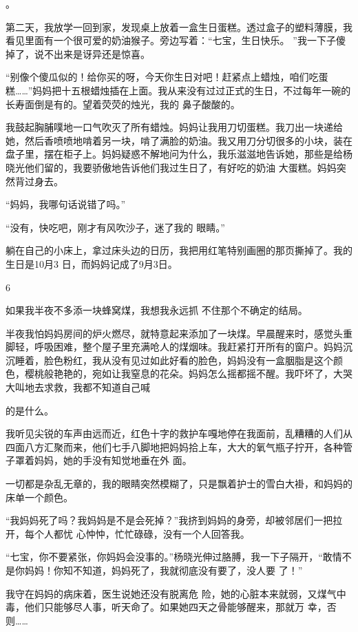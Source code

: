 \documentclass{article}
\begin{document}
。 

第二天，我放学一回到家，发现桌上放着一盒生日蛋糕。透过盒子的塑料薄膜，我看见里面有一个很可爱的奶油猴子。旁边写着：“七宝，生日快乐。
”我一下子傻掉了，说不出来是讶异还是惊喜。 

“别像个傻瓜似的！给你买的呀，今天你生日对吧！赶紧点上蜡烛，咱们吃蛋糕……”妈妈把十五根蜡烛插在上面。我从来没有过过正式的生日，不过每年一碗的长寿面倒是有的。望着荧荧的烛光，我的
鼻子酸酸的。 

我鼓起胸脯噗地一口气吹灭了所有蜡烛。妈妈让我用刀切蛋糕。我刀出一块递给她，然后香喷喷地啃着另一块，啃了满脸的奶油。我又用刀分切很多的小块，装在盘子里，摆在柜子上。妈妈疑惑不解地问为什么，我乐滋滋地告诉她，那些是给杨晓光他们留的，我要骄傲地告诉他们我过生日了，有好吃的奶油
大蛋糕。妈妈突然背过身去。 

\newpage


“妈妈，我哪句话说错了吗。” 

“没有，快吃吧，刚才有风吹沙子，迷了我的
眼睛。” 

躺在自己的小床上，拿过床头边的日历，我把用红笔特别画圈的那页撕掉了。我的生日是10月3
日，而妈妈记成了9月3日。 


6 

如果我半夜不多添一块蜂窝煤，我想我永远抓
不住那个不确定的结局。 

半夜我怕妈妈房间的炉火燃尽，就特意起来添加了一块煤。早晨醒来时，感觉头重脚轻，呼吸困难，整个屋子里充满呛人的煤烟味。我赶紧打开所有的窗户。妈妈沉沉睡着，脸色粉红，我从没有见过如此好看的脸色，妈妈没有一盒胭脂是这个颜色，樱桃般艳艳的，宛如让我窒息的花朵。妈妈怎么摇都摇不醒。我吓坏了，大哭大叫地去求救，我都不知道自己喊
\newpage

的是什么。 

我听见尖锐的车声由远而近，红色十字的救护车嘎地停在我面前，乱糟糟的人们从四面八方汇聚而来，他们七手八脚地把妈妈拾上车，大大的氧气瓶子拧开，各种管子罩着妈妈，她的手没有知觉地垂在外
面。 

一切都是杂乱无章的，我的眼睛突然模糊了，只是飘着护士的雪白大褂，和妈妈的床单一个颜色。

“我妈妈死了吗？我妈妈是不是会死掉？”我挤到妈妈的身旁，却被邻居们一把拉开，每个人都忧
心忡忡，忙忙碌碌，没有一个人回答我。 

“七宝，你不要紧张，你妈妈会没事的。”杨晓光伸过胳膊，我一下子隔开，“敢情不是你妈妈！你知不知道，妈妈死了，我就彻底没有要了，没人要
了！” 

我守在妈妈的病床着，医生说她还没有脱离危
\newpage
险，她的心脏本来就弱，又煤气中毒，他们只能够尽人事，听天命了。如果她四天之骨能够醒来，那就万
幸，否则…… 
\end{document}
